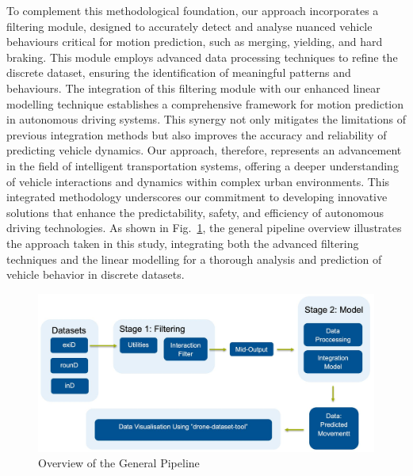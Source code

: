 To complement this methodological foundation, our approach incorporates a filtering module, designed to accurately detect and analyse nuanced vehicle behaviours critical for motion prediction, such as merging, yielding, and hard braking. This module employs advanced data processing techniques to refine the discrete dataset, ensuring the identification of meaningful patterns and behaviours. The integration of this filtering module with our enhanced linear modelling technique establishes a comprehensive framework for motion prediction in autonomous driving systems. This synergy not only mitigates the limitations of previous integration methods but also improves the accuracy and reliability of predicting vehicle dynamics. Our approach, therefore, represents an advancement in the field of intelligent transportation systems, offering a deeper understanding of vehicle interactions and dynamics within complex urban environments. This integrated methodology underscores our commitment to developing innovative solutions that enhance the predictability, safety, and efficiency of autonomous driving technologies. As shown in Fig.~\ref{fig:general_pipeline}, the general pipeline overview illustrates the approach taken in this study, integrating both the advanced filtering techniques and the linear modelling for a thorough analysis and prediction of vehicle behavior in discrete datasets.

\begin{figure}[h]
\centering
\includegraphics[width=\columnwidth]{./images/figures/general_pipeline.jpeg}
\caption{Overview of the General Pipeline}
\label{fig:general_pipeline}
\end{figure}


